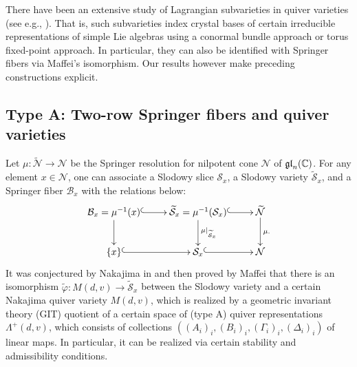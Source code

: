 \documentclass[11pt,reqno]{amsart}
\numberwithin{equation}{section}
\theoremstyle{definition}
\newcommand{\cB}{\mathcal{B}}
\newcommand{\cN}{\mathcal{N}}
\newcommand{\cS}{\mathcal{S}}
\newcommand{\fgl}{\mathfrak{gl}}
\newcommand{\inv}{^{-1}}
\newcommand{\tcN}{\widetilde{\cN}}
\newcommand{\tcS}{\widetilde{\cS}}
\newcommand{\tphi}{\widetilde{\varphi}}
\begin{document}
There have been an extensive study of Lagrangian subvarieties in quiver varieties (see e.g., \cite{Lu91, Lu98, Na94, Nak98, Sai02, KS19}). That is, such subvarieties index crystal bases of certain irreducible representations of simple Lie algebras using a conormal bundle approach or torus fixed-point approach. 
In particular, they can also be identified with Springer fibers via Maffei's isomorphism. Our results however make preceding constructions explicit. 


  
 

\subsection{Type A: Two-row Springer fibers and quiver varieties}
Let $\mu: \tcN \to \cN$ be the Springer resolution for nilpotent cone $\cN$ of $\fgl_n(\CC)$. For any element $x \in \cN$, one can associate a Slodowy slice $\cS_x$, a Slodowy variety $\tcS_x$, and a Springer fiber $\cB_x$ with the relations below:
\[
\xymatrix@-1.25pc{
\mathcal{B}_x = \mu^{-1}(x) \ar[dd] \ar@{^{(}->}[rr]
& & \widetilde{\mathcal{S}}_x =\mu^{-1}(\mathcal{S}_x)  \ar[dd]^{\mu|_{\widetilde{\mathcal{S}}_x}} \ar@{^{(}->}[rr] & &\widetilde{\mathcal{N}} \ar[dd]^{\mu.}
\\
& & & & \\ 
\{ x\}\ar@{^{(}->}[rr] &  & \mathcal{S}_x \ar@{^{(}->}[rr]&  &\mathcal{N} 
}
\] 
It was conjectured by Nakajima in \cite{Na94} and then proved by Maffei \cite[Theorem~8]{Maf05} that there is an isomorphism $\tphi: M(d,v) \to \tcS_x$ between the Slodowy variety and a certain Nakajima quiver variety $M(d,v)$, which is realized by a geometric invariant theory (GIT) quotient of a certain space of (type A) quiver representations $\Lambda^+(d,v)$, which consists of collections $((A_i)_i, (B_i)_i, (\Gamma_i)_i, (\Delta_i)_i)$ of linear maps. In particular, it can be realized via certain stability and admissibility conditions. 
\end{document}
